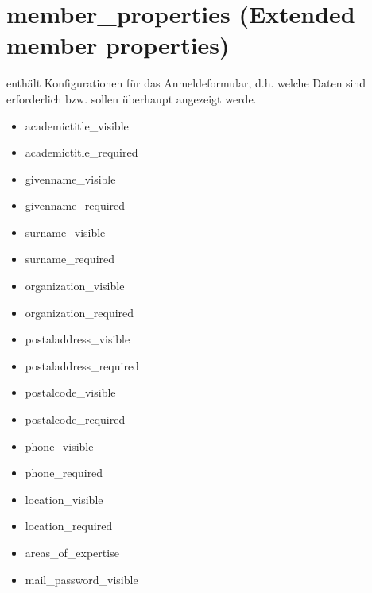 \documentclass[a4paper,10pt,ngerman]{sphinxmanual}
\begin{document}
\section{member\_properties (Extended member properties)}
\label{member_properties:member-properties-extended-member-properties}\label{member_properties::doc}
enthält Konfigurationen für das Anmeldeformular, d.h. welche Daten sind
erforderlich bzw. sollen überhaupt angezeigt werde.
\begin{itemize}
\item {} 
academictitle\_visible

\item {} 
academictitle\_required

\item {} 
givenname\_visible

\item {} 
givenname\_required

\item {} 
surname\_visible

\item {} 
surname\_required

\item {} 
organization\_visible

\item {} 
organization\_required

\item {} 
postaladdress\_visible

\item {} 
postaladdress\_required

\item {} 
postalcode\_visible

\item {} 
postalcode\_required

\item {} 
phone\_visible

\item {} 
phone\_required

\item {} 
location\_visible

\item {} 
location\_required

\item {} 
areas\_of\_expertise

\item {} 
mail\_password\_visible

\end{itemize}
\end{document}
